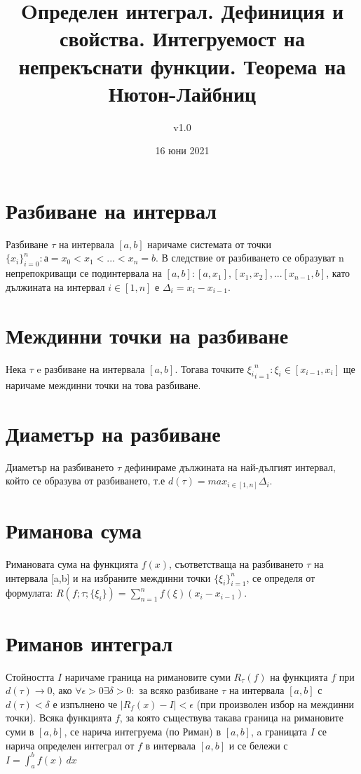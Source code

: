 \documentclass[fleqn,12pt]{article}
\title{Oпределен  интеграл.  Дефиниция  и  свойства.  Интегруемост  на непрекъснати функции. Теорема на Нютон-Лайбниц}
\author{v1.0}
\date{16 юни 2021}
\begin{document}
\maketitle

\tableofcontents
\pagebreak

\begin{flushleft}

\section{Разбиване на интервал}
Разбиване $\tau$ на интервала $[a,b]$ наричаме системата от точки $\{x_i\}_{i=0}^n : а = x_0 < x_1 < ... < x_n = b$. В следствие от разбиването
се образуват n непрепокриващи се подинтервала на $[a,b] : [a, x_1], [x_1, x_2], ... [x_{n-1}, b]$, като дължината на интервал $i \in [1,n]$ е $\Delta_i = x_i - x_{i-1}$.

\section{Междинни точки на разбиване}
Нека $\tau$ e разбиване на интервала $[a,b]$. Тогава точките ${\xi_i}_{i=1}^n : \xi_i \in [x_{i-1},x_i]$ ще наричаме междинни точки на това разбиване.

\section{Диаметър на разбиване}
Диаметър на разбиването $\tau$ дефинираме дължината на най-дългият интервал, който се образува от разбиването, т.е $d(\tau)=max_{i\in[1,n]} \Delta_i$.

\section{Риманова сума}
Римановата сума на функцията $f(x)$, съответстваща на разбиването $\tau$ на интервала [a,b] и на избраните междинни точки $\{\xi_i\}_{i=1}^n$, се определя от формулата: 
$R(f;\tau;\{\xi_i\})=\sum_{n = 1}^{n} f(\xi)(x_i-x_{i-1})$.  

\section{Риманов интеграл}
Стойността $I$ наричаме граница на римановите суми $R_\tau(f)$ на функцията $f$ при $d(\tau)\rightarrow0$, ако $\forall \epsilon>0 \exists \delta>0 :$ за всяко разбиване $\tau$
на интервала $[a,b]$ с $d(\tau)<\delta$ е изпълнено че $|R_f(x) - I|<\epsilon$ (при произволен избор на междинни точки). Всяка функцията $f$, за която съществува такава граница на римановите суми в $[a,b]$,
се нарича интегруема (по Риман) в $[a,b]$, a границата $I$ се нарича определен интеграл от $f$ в интервала $[a,b]$ и се бележи с $I = \int_{a}^{b}  f(x)\,dx$ 


\end{flushleft}
\end{document}
